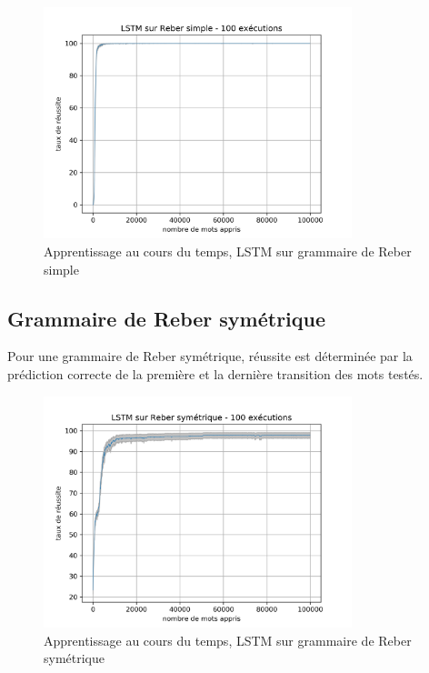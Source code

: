 \begin{figure}[!ht]
\begin{center}
\includegraphics[width=0.8\textwidth]{images/results/lstm_simplereber_ls30_lr01.png}
\caption{Apprentissage au cours du temps, LSTM sur grammaire de Reber simple}
\end{center}
\end{figure}

\subsection{Grammaire de Reber symétrique}
Pour une grammaire de Reber symétrique, réussite est déterminée par la prédiction
correcte de la première et la dernière transition des mots testés.

\begin{figure}[!ht]
\begin{center}
\includegraphics[width=0.8\textwidth]{images/results/lstm_doublereber_ls30_lr01.png}
\caption{Apprentissage au cours du temps, LSTM sur grammaire de Reber symétrique}
\end{center}
\end{figure}
